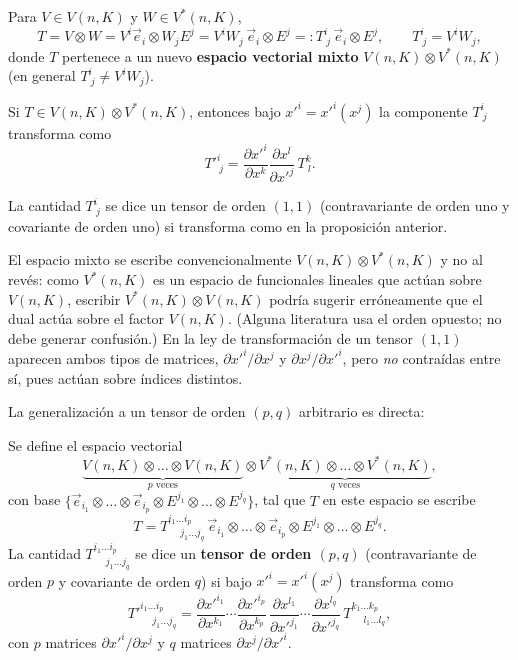 Para $V\in V(n,K)$ y $W\in V^*(n,K)$,
\[
T = V\otimes W = V^i\vec e_i\otimes W_jE^j = V^iW_j\, \vec e_i\otimes E^j
=: T^i_{\ j}\, \vec e_i\otimes E^j, \qquad T^i_{\ j}=V^iW_j,
\]
donde $T$ pertenece a un nuevo \textbf{espacio vectorial mixto}
$V(n,K)\otimes V^*(n,K)$ (en general $T^i_{\ j}\neq V^iW_j$).

\begin{proposicionc}
Si $T\in V(n,K)\otimes V^*(n,K)$, entonces bajo $x'^i=x'^i(x^j)$ la
componente $T^i_{\ j}$ transforma como
\[
T'^i_{\ j} = \frac{\partial x'^i}{\partial x^k}\frac{\partial
x^l}{\partial x'^j}\, T^k_{\ l} .
\]
\end{proposicionc}

\begin{definicion}
La cantidad $T^i_{\ j}$ se dice un tensor de orden $(1,1)$
(contravariante de orden uno y covariante de orden uno) si transforma
como en la proposición anterior.
\end{definicion}

\begin{observacion}
El espacio mixto se escribe convencionalmente $V(n,K)\otimes V^*(n,K)$ y
no al revés: como $V^*(n,K)$ es un espacio de funcionales lineales que
actúan sobre $V(n,K)$, escribir $V^*(n,K)\otimes V(n,K)$ podría sugerir
erróneamente que el dual actúa sobre el factor $V(n,K)$. (Alguna
literatura usa el orden opuesto; no debe generar confusión.) En la ley de
transformación de un tensor $(1,1)$ aparecen ambos tipos de matrices,
$\partial x'^i/\partial x^j$ y $\partial x^j/\partial x'^i$, pero
\emph{no} contraídas entre sí, pues actúan sobre índices distintos.
\end{observacion}

La generalización a un tensor de orden $(p,q)$ arbitrario es directa:

\begin{definicion}
Se define el espacio vectorial
\[
\underbrace{V(n,K)\otimes\dots\otimes V(n,K)}_{p\text{ veces}} \otimes
\underbrace{V^*(n,K)\otimes\dots\otimes V^*(n,K)}_{q\text{ veces}},
\]
con base $\{\vec e_{i_1}\otimes\dots\otimes\vec e_{i_p}\otimes
E^{j_1}\otimes\dots\otimes E^{j_q}\}$, tal que $T$ en este espacio se
escribe
\[
T = T^{i_1\dots i_p}_{\quad\ j_1\dots j_q}\, \vec e_{i_1}\otimes\dots
\otimes\vec e_{i_p}\otimes E^{j_1}\otimes\dots\otimes E^{j_q}.
\]
La cantidad $T^{i_1\dots i_p}_{\quad\ j_1\dots j_q}$ se dice un
\textbf{tensor de orden $(p,q)$} (contravariante de orden $p$ y
covariante de orden $q$) si bajo $x'^i=x'^i(x^j)$ transforma como
\[
T'^{i_1\dots i_p}_{\quad\ j_1\dots j_q} = \frac{\partial
x'^{i_1}}{\partial x^{k_1}}\cdots\frac{\partial x'^{i_p}}{\partial
x^{k_p}}\, \frac{\partial x^{l_1}}{\partial x'^{j_1}}\cdots\frac{\partial
x^{l_q}}{\partial x'^{j_q}}\, T^{k_1\dots k_p}_{\quad\ l_1\dots l_q},
\]
con $p$ matrices $\partial x'^i/\partial x^j$ y $q$ matrices $\partial
x^j/\partial x'^i$.
\end{definicion}

